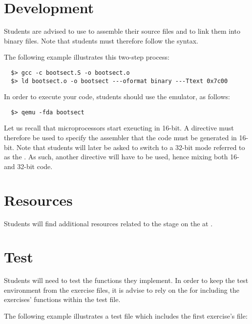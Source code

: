 \section{Development}

Students are advised to use  to assemble
their source files and  to link them into binary files. Note
that students must therefore follow the  syntax.

The following example illustrates this two-step process:

\begin{verbatim}
  $> gcc -c bootsect.S -o bootsect.o
  $> ld bootsect.o -o bootsect ---oformat binary ---Ttext 0x7c00
\end{verbatim}

In order to execute your code, students should use the  emulator,
as follows:

\begin{verbatim}
  $> qemu -fda bootsect
\end{verbatim}

Let us recall that  microprocessors start exeucting in 16-bit. A
directive must therefore be used to specify the assembler that the code
must be generated in 16-bit. Note that students will later be asked to
switch to a 32-bit mode referred to as the . As such,
another directive will have to be used, hence mixing both 16- and 32-bit
code.

%
%

\section{Resources}

Students will find additional resources related to the  stage
on the  at .

%
%

\section{Test}

Students will need to test the functions they implement. In order to keep
the test environment from the exercise files, it is advise to rely on
the  for including the exercises' functions
within the test file.

The following example illustrates a test file which includes the first
exercise's file:

